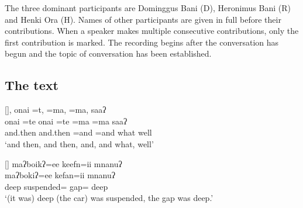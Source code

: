 The three dominant participants are Dominggus Bani
(D), Heronimus Bani (R) and Henki Ora (H).
Names of other participants
are given in full before their contributions.
When a speaker makes multiple consecutive contributions,
only the first contribution is marked.
The recording begins after the conversation has begun
and the topic of conversation has been established.

\newpage
\subsection{The text}
\begin{exe}
\renewcommand{\N}{\tsc{3gen}}

[]{, {onai =t}, =ma, =ma, saaʔ  \\
									{onai =te} {onai =te} =ma =ma saaʔ \\
									and.then and.then =and =and what well \\
						\glt	`and then, and then, and, and what, well'}

[]{\glll	{} maʔboikʔ=ee keefn=ii mnanuʔ \\
									 maʔbokiʔ=ee kefan=ii mnanuʔ \\
									deep suspended={\ee} gap={\ii} deep \\
						\glt	`(it was) deep (the car) was suspended, the gap was deep.'}

\end{exe}
